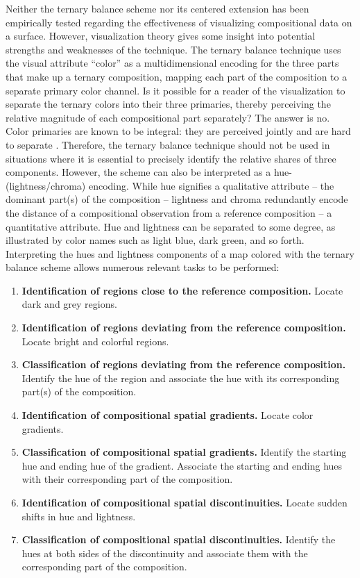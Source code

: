 \documentclass[10pt,twoside,reqno]{article}
\providecommand{\tightlist}{%
  \setlength{\topsep}{0pt}
  \setlength{\partopsep}{0pt}
  \setlength{\itemsep}{0pt}
  \setlength{\parsep}{.9\parskip}
}
\begin{document}
Neither the ternary balance scheme nor its centered extension has been
empirically tested regarding the effectiveness of visualizing
compositional data on a surface. However, visualization theory gives
some insight into potential strengths and weaknesses of the technique.
The ternary balance technique uses the visual attribute ``color'' as a
multidimensional encoding for the three parts that make up a ternary
composition, mapping each part of the composition to a separate primary
color channel. Is it possible for a reader of the visualization to
separate the ternary colors into their three primaries, thereby
perceiving the relative magnitude of each compositional part separately?
The answer is no. Color primaries are known to be integral: they are
perceived jointly and are hard to separate \citep{Ware2013}. Therefore,
the ternary balance technique should not be used in situations where it
is essential to precisely identify the relative shares of three
components. However, the scheme can also be interpreted as a
hue-(lightness/chroma) encoding. While hue signifies a qualitative
attribute -- the dominant part(s) of the composition -- lightness and
chroma redundantly encode the distance of a compositional observation
from a reference composition -- a quantitative attribute. Hue and
lightness can be separated to some degree, as illustrated by color names
such as light blue, dark green, and so forth. Interpreting the hues and
lightness components of a map colored with the ternary balance scheme
allows numerous relevant tasks to be performed:

\begin{enumerate}
\def\labelenumi{\arabic{enumi}.}
\tightlist
\item
  \textbf{Identification of regions close to the reference composition.}
  Locate dark and grey regions.
\item
  \textbf{Identification of regions deviating from the reference
  composition.} Locate bright and colorful regions.
\item
  \textbf{Classification of regions deviating from the reference
  composition.} Identify the hue of the region and associate the hue
  with its corresponding part(s) of the composition.
\item
  \textbf{Identification of compositional spatial gradients.} Locate
  color gradients.
\item
  \textbf{Classification of compositional spatial gradients.} Identify
  the starting hue and ending hue of the gradient. Associate the
  starting and ending hues with their corresponding part of the
  composition.
\item
  \textbf{Identification of compositional spatial discontinuities.}
  Locate sudden shifts in hue and lightness.
\item
  \textbf{Classification of compositional spatial discontinuities.}
  Identify the hues at both sides of the discontinuity and associate
  them with the corresponding part of the composition.
\end{enumerate}
\end{document}
